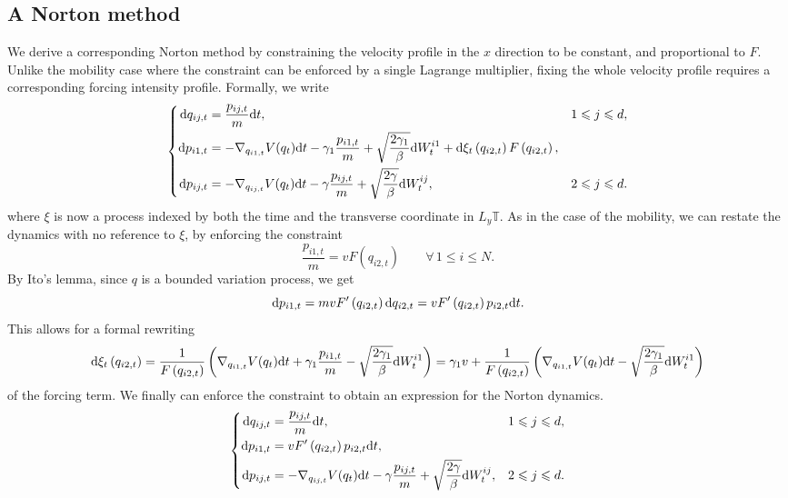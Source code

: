 \subsection{A Norton method}
We derive a corresponding Norton method by constraining the velocity profile in the $x$ direction to be constant, and proportional to $F$.
Unlike the mobility case where the constraint can be enforced by a single Lagrange multiplier, fixing the whole velocity profile requires a corresponding forcing intensity profile.
Formally, we write
\begin{equation}
    \left\{\begin{aligned}
        \mathrm{d} q_{ij,t}&=\frac{p_{ij,t}}m\mathrm{d} t,&1\leqslant j\leqslant d,\\
        \mathrm{d} p_{i1,t}&=-\nabla_{q_{i1,t}}V(q_t)\mathrm{d} t-\gamma_1\frac{p_{i1,t}}m+\sqrt{\frac{2\gamma_1}\beta}\mathrm{d} W_t^{i1}+\mathrm{d}\xi_t\left(q_{i2,t}\right) F\left(q_{i2,t}\right),&\\
        \mathrm{d} p_{ij,t}&=-\nabla_{q_{ij,t}}V(q_t)\mathrm{d} t-\gamma \frac{p_{ij,t}}m+\sqrt{\frac{2\gamma}\beta}\mathrm{d} W_t^{ij},&2\leqslant j\leqslant d.
    \end{aligned}\right.
\end{equation}
where $\xi$ is now a process indexed by both the time and the transverse coordinate in $L_y \mathbb T$.
As in the case of the mobility, we can restate the dynamics with no reference to $\xi$, by enforcing the constraint
\begin{equation}
    \label{eq:norton_shear_viscosity_constraint}
    \frac{p_{i1,t}}m=vF\left(q_{i2,t}\right)\qquad \forall\, 1\leq i\leq N.
\end{equation}
By Ito's lemma, since $q$ is a bounded variation process, we get
\[\mathrm{d}{p_{i1,t}}=mvF'\left(q_{i2,t}\right)\mathrm{d} q_{i2,t}=vF'\left(q_{i2,t}\right)p_{i2,t}\mathrm{d} t.\]
This allows for a formal rewriting 
\begin{equation}\label{eq:norton_sv_multiplier}\mathrm{d}\xi_t\left(q_{i2,t}\right)= \frac 1{F\left(q_{i2,t}\right)}\left(\nabla_{q_{i1,t}}V(q_t)\mathrm{d} t+\gamma_1\frac{p_{i1,t}}m-\sqrt{\frac{2\gamma_1}\beta}\mathrm{d} W_t^{i1}\right)=\gamma_1v+\frac 1{F\left(q_{i2,t}\right)}\left(\nabla_{q_{i1,t}}V(q_t)\mathrm{d} t-\sqrt{\frac{2\gamma_1}\beta}\mathrm{d} W_t^{i1}\right)\end{equation}
of the forcing term. We finally can enforce the constraint to obtain an expression for the Norton dynamics.
\begin{equation}
    \label{eq:norton_sv_dynamics}
    \left\{\begin{aligned}
        \mathrm{d} q_{ij,t}&=\frac{p_{ij,t}}m\mathrm{d} t,&1\leqslant j\leqslant d,\\
        \mathrm{d} p_{i1,t}&=vF'\left(q_{i2,t}\right)p_{i2,t}\mathrm{d} t,&\\
        \mathrm{d} p_{ij,t}&=-\nabla_{q_{ij,t}}V(q_t)\mathrm{d} t-\gamma \frac{p_{ij,t}}m+\sqrt{\frac{2\gamma}\beta}\mathrm{d} W_t^{ij},&2\leqslant j\leqslant d.
    \end{aligned}\right.
\end{equation}


